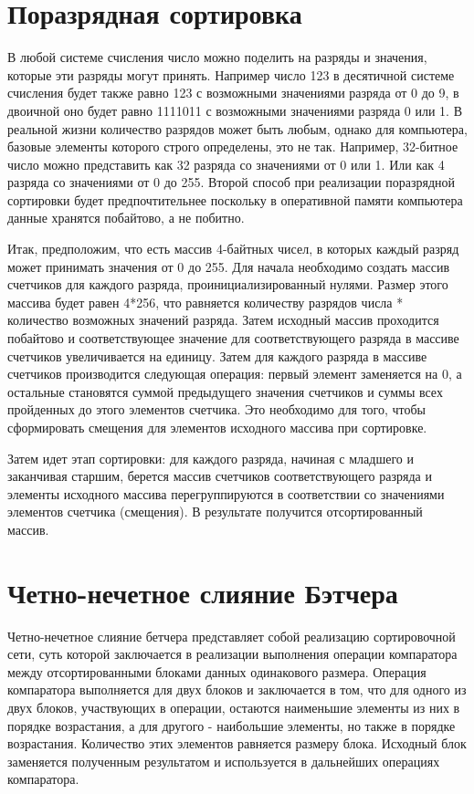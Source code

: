\documentclass{report}
\begin{document}
\newpage

\section*{Поразрядная сортировка}
\par В любой системе счисления число можно поделить на разряды и значения, которые эти разряды могут принять. Например число 123 в десятичной системе счисления будет также равно 123 с возможными значениями разряда от 0 до 9, в двоичной оно будет равно 1111011 с возможными значениями разряда 0 или 1. В реальной жизни количество разрядов может быть любым, однако для компьютера, базовые элементы которого строго определены, это не так. Например, 32-битное число можно представить как 32 разряда со значениями от 0 или 1. Или как 4 разряда со значениями от 0 до 255. Второй способ при реализации поразрядной сортировки будет предпочтительнее поскольку в оперативной памяти компьютера данные хранятся побайтово, а не побитно.
\par Итак, предположим, что есть массив 4-байтных чисел, в которых каждый разряд может принимать значения от 0 до 255. Для начала необходимо создать массив счетчиков для каждого разряда, проинициализированный нулями. Размер этого массива будет равен 4*256, что равняется количеству разрядов числа * количество возможных значений разряда. Затем исходный массив проходится побайтово и соответствующее значение для соответствующего разряда в массиве счетчиков увеличивается на единицу. Затем для каждого разряда в массиве счетчиков производится следующая операция: первый элемент заменяется на 0, а остальные становятся суммой предыдущего значения счетчиков и суммы всех пройденных до этого элементов счетчика. Это необходимо для того, чтобы сформировать смещения для элементов исходного массива при сортировке.
\par Затем идет этап сортировки: для каждого разряда, начиная с младшего и заканчивая старшим, берется массив счетчиков соответствующего разряда и элементы исходного массива перегруппируются в соответствии со значениями элементов счетчика (смещения). В результате получится отсортированный массив.

\newpage

\section*{Четно-нечетное слияние Бэтчера}
\par Четно-нечетное слияние бетчера представляет собой реализацию сортировочной сети, суть которой заключается в реализации выполнения операции компаратора между отсортированными блоками данных одинакового размера. Операция компаратора выполняется для двух блоков и заключается в том, что для одного из двух блоков, участвующих в операции, остаются наименьшие элементы из них в порядке возрастания, а для другого - наибольшие элементы, но также в порядке возрастания. Количество этих элементов равняется размеру блока. Исходный блок заменяется полученным результатом и используется в дальнейших операциях компаратора.
\end{document}
